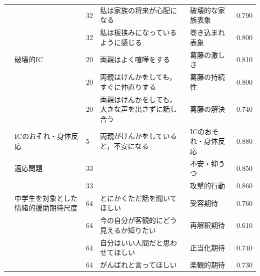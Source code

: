 \begin{landscape}
\begin{longtable}{p{2cm}p{2cm}p{2cm}p{6cm}p{2cm}p{2cm}}
                                 &                                  & 32  & 私は家族の将来が心配になる                                       & 破壊的な家族表象             & 0.790   \\
                                 &                                  & 32  & 私は板挟みになっているように感じる                                   & 巻き込まれ表象              & 0.800   \\
                                 & 破壊的IC                            & 20  & 両親はよく喧嘩をする                                          & 葛藤の激しさ               & 0.810   \\
                                 &                                  & 20  & 両親はけんかをしても，すぐに仲直りする                                 & 葛藤の持続性               & 0.800   \\
                                 &                                  & 20  & 両親はけんかをしても，大きな声を出さずに話し合う                            & 葛藤の解決                & 0.740   \\
                                 & ICのおそれ・身体反応                      & 5   & 両親がけんかをしていると，不安になる                                  & ICのおそれ・身体反応          & 0.880   \\
                                 & 適応問題                             & 33  &                                                     & 不安・抑うつ               & 0.850   \\
                                 &                                  & 33  &                                                     & 攻撃的行動                & 0.860   \\
        \citet{Amai202192}       & 中学生を対象とした情緒的援助期待尺度               & 64  & とにかくただ話を聞いてほしい                                      & 受容期待                 & 0.760   \\
                                 &                                  & 64  & 今の自分が客観的にどう見えるか知りたい                                 & 再解釈期待                & 0.610   \\
                                 &                                  & 64  & 自分はいい人間だと思わせてほしい                                    & 正当化期待                & 0.740   \\
                                 &                                  & 64  & がんばれと言ってほしい                                         & 楽観的期待                & 0.730   \\

\end{longtable}
\end{landscape}
